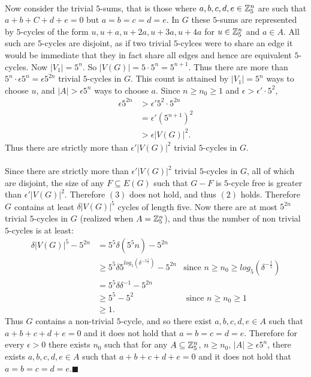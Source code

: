 \documentclass[letterpaper,12pt,oneside,onecolumn]{article}
\begin{document}
\paragraph{}
Now consider the trivial $5$-sums, that is those where $a,b,c,d,e \in \mathbb{Z}_5^n$ are such that $a+b+C+d+e=0$ but $a=b=c=d=e$. In $G$ these $5$-sums are represented by $5$-cycles of the form $u, u+a, u+2a, u+3a, u+4a$ for $u \in \mathbb{Z}_5^n$ and $a \in A$. All such are $5$-cycles are disjoint, as if two trivial $5$-cylces were to share an edge it would be immediate that they in fact share all edges and hence are equivalent $5$-cycles. Now $|V_1| = 5^n$. So $|V(G)| = 5\cdot 5^n =5^{n+1}$. Thus there are more than $5^n \cdot \epsilon 5^n = \epsilon 5^{2n}$ trivial $5$-cycles in $G$. This count is attained by $|V_1| = 5^n$ ways to choose $u$, and $|A| > \epsilon 5^n$ ways to choose $a$. Since $n\geq n_0 \geq 1$ and $\epsilon > \epsilon'\cdot 5^2$, 
\begin{align*}
\epsilon 5^{2n} &> \epsilon' 5^2 \cdot 5^{2n} \\&= \epsilon' (5^{n+1})^2 \\&> \epsilon |V(G)|^2.
\end{align*}
Thus there are strictly more than $\epsilon' |V(G)|^2$ trivial $5$-cycles in $G$.
\paragraph{}
Since there are strictly more than $\epsilon' |V(G)|^2$ trivial $5$-cycles in $G$, all of which are disjoint, the size of any $F \subseteq E(G)$ such that $G-F$ is $5$-cycle free is greater than $\epsilon' |V(G)|^2$. Therefore $(3)$ does not hold, and thus $(2)$ holds. Therefore $G$ contains at least $\delta |V(G)|^5$ cycles of length five. Now there are at most $5^{2n}$ trivial $5$-cycles in $G$ (realized when $A = \mathbb{Z}_5^n$), and thus the number of non trivial $5$-cycles is at least:
\begin{align*}
\delta |V(G)|^5 - 5^{2n} &= 5^5\delta (5^5n) - 5^{2n}\\
&\geq 5^5 \delta 5^{log_5(\delta^{-5\frac{1}{5}})} - 5^{2n} &\text{since $n \geq n_0 \geq log_5(\delta^{-\frac{1}{5}})$} \\
&= 5^5 \delta \delta^{-1} - 5^{2n} \\
&\geq 5^5 - 5^2 &\text{ since $n \geq n_0 \geq 1$} \\
&\geq 1.
\end{align*}
Thus $G$ contains a non-trivial $5$-cycle, and so there exist $a,b,c,d,e \in A$ such that $a+b+c+d+e = 0$ and it does not hold that $a=b=c=d=e$. Therefore for every $\epsilon > 0$ there exists $n_0$ such that for any $A \subseteq \mathbb{Z}_5^n$, $n\geq n_0$, $|A| \geq \epsilon 5^n$, there exists $a,b,c,d,e \in A$ such that $a+b+c+d+e=0$ and it does not hold that $a=b=c=d=e$.$\blacksquare$
\end{document}
